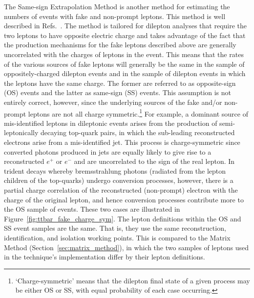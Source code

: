 The Same-sign Extrapolation Method is another method for
estimating the numbers of events with fake and non-prompt leptons.
This method is well described in Refs.~\cite{TOPQ-2015-09,TOPQ-2017-05}.
The method is tailored for dilepton analyses that require the two
leptons to have opposite electric charge and takes advantage of the fact that the
production mechanisms for the fake leptons described above are generally
uncorrelated with the charges of leptons in the event.
This means that the rates of the various sources of fake leptons will generally
be the same in the sample of oppositely-charged dilepton events and in the
sample of dilepton events in which the leptons have the same charge.
The former are referred to as opposite-sign (OS) events and the latter
as same-sign (SS) events.
This assumption is not entirely correct, however, since the underlying sources of
the fake and/or non-prompt leptons are not all charge symmetric.\footnote{`Charge-symmetric' means that the
dilepton final state of a given process may be either OS or SS, with equal probability of each case occurring.}
For example, a dominant source of mis-identified leptons in dileptonic events
arises from the production of semi-leptonically decaying top-quark pairs, in which the sub-leading reconstructed
electrons arise from a mis-identified jet.
This process is charge-symmetric since
converted photons produced in jets are equally likely to give rise to a reconstructed
$e^+$ or $e^-$ and are uncorrelated to the sign of the real lepton.
In trident decays whereby bremsstrahlung photons (radiated from the lepton children
of the top-quarks) undergo conversion processes, however, there is a partial
charge correlation of the reconstructed (non-prompt) electron with the charge of the original lepton,
and hence conversion processes contribute more to the OS sample of events.
These two cases are illustrated in Figure~\ref{fig:ttbar_fake_charge_sym}.
The lepton definitions within the OS and SS event samples are the same.
That is, they use the same reconstruction, identification, and isolation working points.
This is compared to the Matrix Method (Section~\ref{sec:matrix_method}), in which the two samples of leptons used in the technique's
implementation differ by their lepton definitions.

